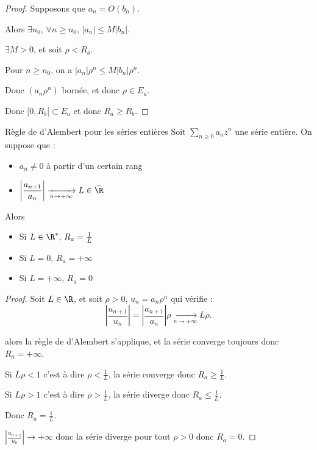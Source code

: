 
\begin{proof}
    Supposons que $a_n = O(b_n)$. 

    Alors $\exists n_0, \, \forall n \geqslant n_0, \, |a_n| \leqslant M |b_n|$.

    $\exists M > 0$, et soit $\rho < R_b$. 

    Pour $n \geqslant n_0$, on a $|a_n| \rho^n \leqslant M |b_n| \rho^n$.

    Donc $(a_n \rho^n)$ bornée, et donc $\rho \in E_a$.

    Donc $[0, R_b[ \subset E_a$ et donc $R_a \geqslant R_b$.
\end{proof}



\begin{theoreme}{Règle de d'Alembert pour les séries entières}{}
    Soit $\sum_{n \geqslant 0} a_n z^n$ une série entière. On suppose que : 
    \begin{itemize}
        \item $a_n \neq 0$ à partir d'un certain rang
        \item $\displaystyle \left| \frac{a_{n + 1 }}{a_n } \right| \xrightarrow[n \to + \infty   ]{} L \in \bar \R$ 
    \end{itemize}

    Alors 
    \begin{itemize}
        \item Si $L \in \R^*, \, R_a = \frac 1 L$
        \item Si $L = 0, \, R_a = +\infty$
        \item Si $L = +\infty, \, R_a = 0$
    \end{itemize}
\end{theoreme}


\begin{proof}
    Soit $L \in \R$, et soit $\rho > 0$, $u_n = a_n \rho^n$ qui vérifie :
    \[
        \left| \frac{u_{n + 1}}{u_n} \right| = \left| \frac{a_{n + 1}}{a_n} \right| \rho \xrightarrow[n \to + \infty ]{} L \rho.
    \]

     alors la règle de d'Alembert s'applique, et la série converge toujours 
    donc $R_a = +\infty$.

    
    \avspace Si $L \rho < 1$ c'est à dire $\rho < \frac 1 L$, la série converge donc $R_a \geqslant \frac 1 L$.

    Si $L \rho > 1$ c'est à dire $\rho > \frac 1 L$, la série diverge donc $R_a \leqslant \frac 1 L$.

    Donc $R_a = \frac 1 L$.


    \avspace $\displaystyle \left| \frac{u_{n + 1}}{u_n } \right| \to + \infty$ donc la série diverge 
    pour tout $\rho > 0$ donc $R_a = 0$.
\end{proof}

